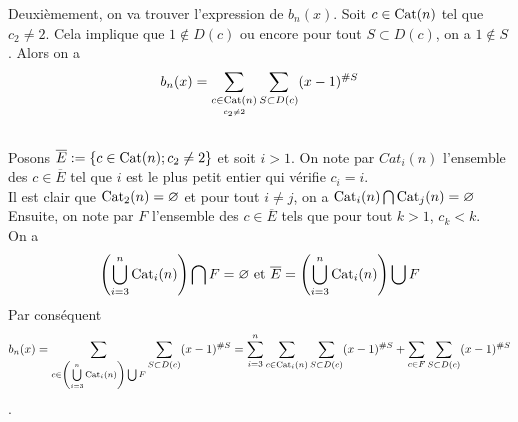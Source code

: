 Deuxièmement, on va trouver l'expression de $b_{n}(x)$. Soit $c\in \begin{rm}Cat\end{rm}(n)$ tel que $c_{2}\neq 2$. Cela implique que $1\notin D(c)$ ou encore pour tout $S\subset D(c)$, on a $1\notin S$. Alors on a $$b_{n}(x) = \sum\limits_{\underset{c_{2}\neq 2}{c\in \begin{rm}Cat\end{rm}(n)}} \sum\limits_{S\subset D(c)}(x-1)^{\#S}$$\\
Posons $\overline{E}:=\{c\in \begin{rm}Cat\end{rm}(n); c_{2}\neq 2\}$ et soit $i>1$. On note par $Cat_{i}(n)$ l'ensemble des $c\in \overline{E}$ tel que $i$ est le plus petit entier
qui vérifie $c_{i}=i$.\\
Il est clair que $\begin{rm}Cat\end{rm}_{2}(n)=\varnothing$ et pour tout $i \neq j$, on a $\begin{rm}Cat\end{rm}_{i}(n)\bigcap \begin{rm}Cat\end{rm}_{j}(n)=\varnothing$\\
Ensuite, on note par $F$ l'ensemble des $c\in \overline{E}$ tels que pour tout $k>1$,
$c_{k}<k$.\\
On a \[
	\left(\bigcup\limits_{i=3}^{n}\begin{rm}Cat\end{rm}_{i}(n)\right)\bigcap F=\varnothing \text{ et } \overline{E}=\left(\bigcup\limits_{i=3}^{n}\begin{rm}Cat\end{rm}_{i}(n)\right)\bigcup F
\]
Par conséquent $$b_{n}(x)=  \sum\limits_{c\in \left(\bigcup\limits_{i=3}^{n}\begin{rm}Cat\end{rm}_{i}(n)\right)\bigcup F} \sum\limits_{S\subset D(c)}(x-1)^{\#S}=\sum\limits_{i=3}^{n}\sum\limits_{c\in \begin{rm}\begin{rm}Cat\end{rm}\end{rm}_{i}(n)} \sum\limits_{S\subset D(c)}(x-1)^{\#S} + \sum\limits_{c\in F} \sum\limits_{S\subset D(c)}(x-1)^{\#S}$$. \\
